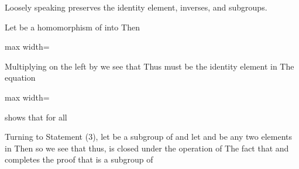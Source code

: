 \documentclass[11pt,oneside]{article}
\begin{document}
\begin{BookBody}




\noindent Loosely speaking\BookInline{,\allowbreak \phi } preserves the identity element, inverses, and subgroups.

 Let \BookInline{\phi } be a homomorphism of  into  Then

\begin{center}\begin{adjustbox}{max width=\linewidth}\end{adjustbox}\end{center}

\noindent Multiplying on the left by  we see that  Thus  must be the identity element  in  The equation

\begin{center}\begin{adjustbox}{max width=\linewidth}\end{adjustbox}\end{center}

\noindent shows that  for all 

Turning to Statement (3), let  be a subgroup of  and let  and  be any two elements in  Then  so we see that  thus, \BookInline{\phi [H]} is closed under the operation of  The fact that  and  completes the proof that \BookInline{\phi [H]} is a subgroup of 


\end{BookBody}
\end{document}
